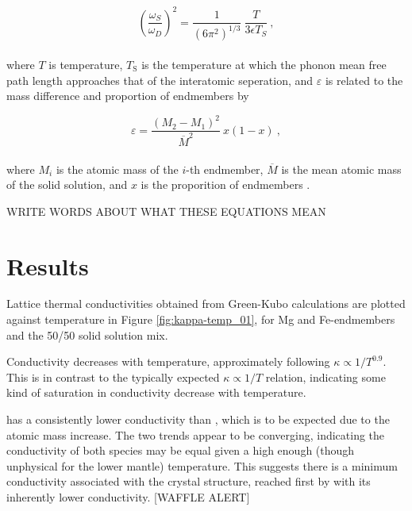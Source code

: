 \begin{equation}
\left ( \frac{\omega_{S}}{\omega_{D}} \right )^{2} = \frac{1}{\left ( 6\pi^{2} \right )^{1/3}} \ \frac{T}{3 \epsilon T_{S}} \ ,
\end{equation}
\\
where $T$ is temperature, $T_{\mathrm{S}}$ is the temperature at which the phonon mean free path length approaches that of the interatomic seperation, and $\varepsilon$ is related to the mass difference and proportion of endmembers by

\begin{equation}
\varepsilon = \frac{\left (M_{2}-M_{1}  \right )^{2}}{\overline{M}^{2}} \ x\left ( 1-x \right ) \ ,
\end{equation}
\\
where $M_{i}$ is the atomic mass of the $i$-th endmember, $\overline{M}$ is the mean atomic mass of the solid solution, and $x$ is the proporition of endmembers \citep[][Eq. S9]{Stackhouse2015}.

WRITE WORDS ABOUT WHAT THESE EQUATIONS MEAN





\section{Results}

Lattice thermal conductivities obtained from Green-Kubo calculations are plotted against temperature in Figure \ref{fig:kappa-temp_01}, for Mg and Fe-endmembers and the 50/50 solid solution mix.

Conductivity decreases with temperature, approximately following $\kappa \propto 1/T^{0.9}$. This is in contrast to the typically expected $\kappa \propto 1/T$ relation, indicating some kind of saturation in conductivity decrease with temperature.

\fesios has a consistently lower conductivity than \mgsio, which is to be expected due to the atomic mass increase. The two trends appear to be converging, indicating the conductivity of both species may be equal given a high enough (though unphysical for the lower mantle) temperature. This suggests there is a minimum conductivity associated with the crystal structure, reached first by \fesios with its inherently lower conductivity. [WAFFLE ALERT]

